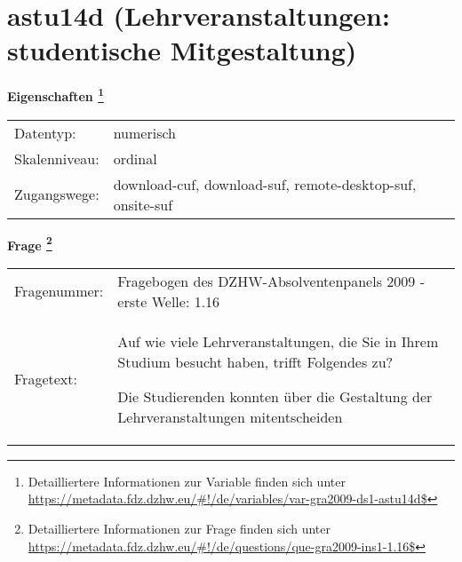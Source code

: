 
    \setcounter{footnote}{0}

    \vspace*{-1.8cm}
	\section{astu14d (Lehrveranstaltungen: studentische Mitgestaltung)}
	\label{section:astu14d}



    \vspace*{0.5cm}
    \noindent\textbf{Eigenschaften
	\footnote{Detailliertere Informationen zur Variable finden sich unter
		\url{https://metadata.fdz.dzhw.eu/\#!/de/variables/var-gra2009-ds1-astu14d$}}}\\
	\begin{tabularx}{\hsize}{@{}lX}
	Datentyp: & numerisch \\
	Skalenniveau: & ordinal \\
	Zugangswege: &
	  download-cuf, 
	  download-suf, 
	  remote-desktop-suf, 
	  onsite-suf
 \\
    \end{tabularx}



				\vspace*{0.5cm}
                \noindent\textbf{Frage
	                \footnote{Detailliertere Informationen zur Frage finden sich unter
		              \url{https://metadata.fdz.dzhw.eu/\#!/de/questions/que-gra2009-ins1-1.16$}}}\\
				\begin{tabularx}{\hsize}{@{}lX}
					Fragenummer: &
					  Fragebogen des DZHW-Absolventenpanels 2009 - erste Welle:
					  1.16
 \\
					Fragetext: & Auf wie viele Lehrveranstaltungen, die Sie in Ihrem Studium besucht haben, trifft Folgendes zu?\par  Die Studierenden konnten über die Gestaltung der Lehrveranstaltungen mitentscheiden \\
				\end{tabularx}





